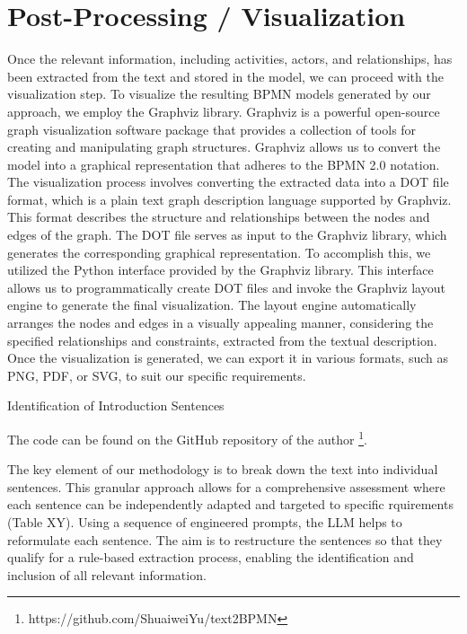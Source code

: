\section{Post-Processing / Visualization}
Once the relevant information, including activities, actors, and relationships, has been extracted from the text and stored in the model, we can proceed with the visualization step. To visualize the resulting BPMN models generated by our approach, we employ the Graphviz library. Graphviz is a powerful open-source graph visualization software package that provides a collection of tools for creating and manipulating graph structures. Graphviz allows us to convert the model into a graphical representation that adheres to the BPMN 2.0 notation. The visualization process involves converting the extracted data into a DOT file format, which is a plain text graph description language supported by Graphviz.  This format describes the structure and relationships between the nodes and edges of the graph. The DOT file serves as input to the Graphviz library, which generates the corresponding graphical representation. To accomplish this, we utilized the Python interface provided by the Graphviz library. This interface allows us to programmatically create DOT files and invoke the Graphviz layout engine to generate the final visualization. The layout engine automatically arranges the nodes and edges in a visually appealing manner, considering the specified relationships and constraints, extracted from the textual description. Once the visualization is generated, we can export it in various formats, such as PNG, PDF, or SVG, to suit our specific requirements.
\pagebreak



\caption{Identification of Introduction Sentences}



The code can be found on the GitHub repository of the author \footnote{https://github.com/ShuaiweiYu/text2BPMN}.



The key element of our methodology is to break down the text into individual sentences. This granular approach allows for a comprehensive assessment where each sentence can be independently adapted and targeted to specific rquirements (Table XY). Using a sequence of  engineered prompts, the LLM helps to reformulate each sentence. The aim is to restructure the sentences so that they qualify for a rule-based extraction process, enabling the identification and inclusion of all relevant information.




